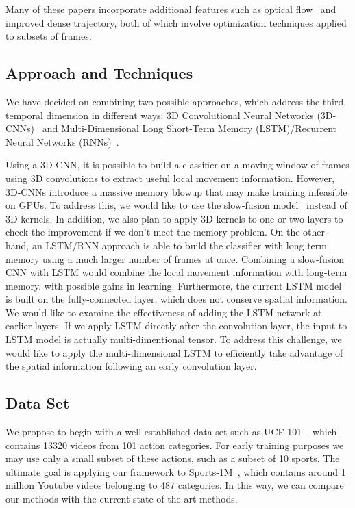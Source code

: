 Many of these papers incorporate additional features such as optical flow~\cite{brox} and improved dense trajectory, both of which involve optimization techniques applied to subsets of frames. 
\subsection*{Approach and Techniques}
We have decided on combining two possible approaches, which address
the third, temporal dimension in different ways: 3D Convolutional Neural
Networks (3D-CNNs)~\cite{stf,cnnvid} and Multi-Dimensional Long
Short-Term Memory (LSTM)/Recurrent Neural Networks (RNNs)~\cite{ltrcn}. 

Using a 3D-CNN, it is possible to build a classifier on a moving window
of frames using 3D convolutions to extract useful local movement information. However, 3D-CNNs introduce a massive memory blowup that may make training infeasible on GPUs.
To address this, we would like to use the slow-fusion model~\cite{cnnvid} instead of 3D kernels. In addition, we also plan to apply 3D kernels to one or two layers to check the improvement if we don't meet the memory problem. On the other hand, an LSTM/RNN approach is able to build the classifier with long term memory using a much larger number of frames at once. Combining a slow-fusion CNN with LSTM would combine the local movement information with long-term memory, with possible gains in learning.
Furthermore, the current LSTM model is built on the fully-connected
layer, which does not conserve spatial information. We would like to examine the 
effectiveness of adding the LSTM network at earlier layers.
If we apply LSTM directly after the convolution layer,
the input to LSTM model is actually multi-dimentional tensor. To address
this challenge, we would like to apply the multi-dimensional LSTM
\cite{byeon2015scene} to efficiently take advantage of the spatial
information following an early convolution layer. 

\subsection*{Data Set}
We propose to begin with a well-established data set such as UCF-101~\cite{ucf101}, which contains 13320 videos from 101 action categories. For early training purposes we may use only a small subset of these actions, such as a subset of 10 sports. The ultimate goal is applying our framework to Sports-1M~\cite{cnnvid}, which contains around 1 million Youtube videos belonging to 487 categories. In this way, we can compare our methods with the current state-of-the-art methods.

